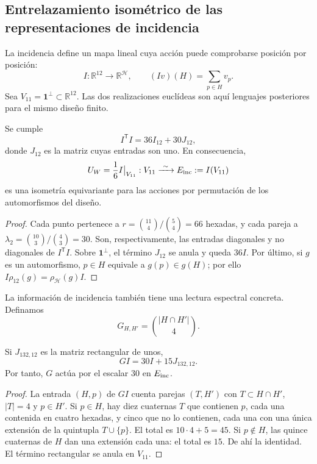 

\subsection{Entrelazamiento isométrico de las representaciones de incidencia}
\label{exc:entrelazador}

La incidencia define un mapa lineal cuya acción puede comprobarse
posición por posición:
\begin{equation}
 I:\mathbb R^{12}\longrightarrow\mathbb R^{\mathcal H},
 \qquad (Iv)(H)=\sum_{p\in H}v_p.
 \label{exc:incidencia}
\end{equation}
Sea $V_{11}=\mathbf1^\perp\subset\mathbb R^{12}$. Las dos realizaciones
euclídeas son aquí lenguajes posteriores para el mismo diseño finito.

\begin{proposition}
\label{exc:isometria}
Se cumple
\[
 I^{\mathsf T}I=36I_{12}+30J_{12},
\]
donde $J_{12}$ es la matriz cuyas entradas son uno. En consecuencia,
\[
 U_W=\frac16 I\big|_{V_{11}}:
 V_{11}\xrightarrow{\ \sim\ }E_{\rm inc}:=I(V_{11})
\]
es una isometría equivariante para las acciones por permutación de los
automorfismos del diseño.
\end{proposition}

\begin{proof}
Cada punto pertenece a
$r=\binom{11}{4}/\binom54=66$ hexadas, y cada pareja a
$\lambda_2=\binom{10}{3}/\binom43=30$. Son, respectivamente, las
entradas diagonales y no diagonales de $I^{\mathsf T}I$. Sobre
$\mathbf1^\perp$, el término $J_{12}$ se anula y queda $36I$.
Por último, si $g$ es un automorfismo, $p\in H$ equivale a
$g(p)\in g(H)$; por ello $I\rho_{12}(g)=\rho_{\mathcal H}(g)I$.
\end{proof}

La información de incidencia también tiene una lectura espectral
concreta. Definamos
\[
 G_{H,H'}=\binom{|H\cap H'|}{4}.
\]

\begin{lemma}
\label{exc:espectro}
Si $J_{132,12}$ es la matriz rectangular de unos,
\[
 GI=30I+15J_{132,12}.
\]
Por tanto, $G$ actúa por el escalar $30$ en $E_{\rm inc}$.
\end{lemma}

\begin{proof}
La entrada $(H,p)$ de $GI$ cuenta parejas $(T,H')$ con
$T\subset H\cap H'$, $|T|=4$ y $p\in H'$. Si $p\in H$, hay diez
cuaternas $T$ que contienen $p$, cada una contenida en cuatro hexadas,
y cinco que no lo contienen, cada una con una única extensión de la
quintupla $T\cup\{p\}$. El total es $10\cdot4+5=45$.
Si $p\notin H$, las quince cuaternas de $H$ dan una extensión cada
una: el total es $15$. De ahí la identidad. El término rectangular
se anula en $V_{11}$.
\end{proof}

